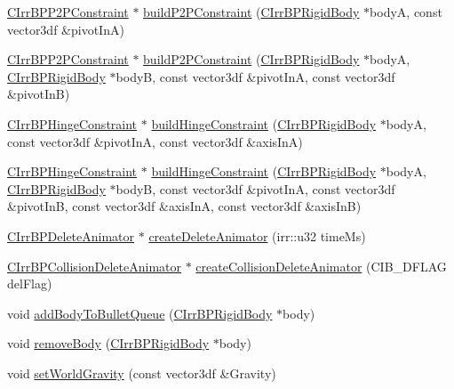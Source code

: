 \begin{DoxyCompactItemize}
\item 
\hyperlink{class_c_irr_b_p_p2_p_constraint}{CIrrBPP2PConstraint} $\ast$ \hyperlink{class_c_irr_b_p_manager_ab9b2ccaf431413e1ada692eb208a2302}{buildP2PConstraint} (\hyperlink{class_c_irr_b_p_rigid_body}{CIrrBPRigidBody} $\ast$bodyA, const vector3df \&pivotInA)
\item 
\hyperlink{class_c_irr_b_p_p2_p_constraint}{CIrrBPP2PConstraint} $\ast$ \hyperlink{class_c_irr_b_p_manager_aae111a76d0283935a6c7aa8dfb98e457}{buildP2PConstraint} (\hyperlink{class_c_irr_b_p_rigid_body}{CIrrBPRigidBody} $\ast$bodyA, \hyperlink{class_c_irr_b_p_rigid_body}{CIrrBPRigidBody} $\ast$bodyB, const vector3df \&pivotInA, const vector3df \&pivotInB)
\item 
\hyperlink{class_c_irr_b_p_hinge_constraint}{CIrrBPHingeConstraint} $\ast$ \hyperlink{class_c_irr_b_p_manager_a87b2610eaba14775ac81992ff71ab436}{buildHingeConstraint} (\hyperlink{class_c_irr_b_p_rigid_body}{CIrrBPRigidBody} $\ast$bodyA, const vector3df \&pivotInA, const vector3df \&axisInA)
\item 
\hyperlink{class_c_irr_b_p_hinge_constraint}{CIrrBPHingeConstraint} $\ast$ \hyperlink{class_c_irr_b_p_manager_a8a61e921b487d6249e46022b6e9b5ccf}{buildHingeConstraint} (\hyperlink{class_c_irr_b_p_rigid_body}{CIrrBPRigidBody} $\ast$bodyA, \hyperlink{class_c_irr_b_p_rigid_body}{CIrrBPRigidBody} $\ast$bodyB, const vector3df \&pivotInA, const vector3df \&pivotInB, const vector3df \&axisInA, const vector3df \&axisInB)
\item 
\hyperlink{class_c_irr_b_p_delete_animator}{CIrrBPDeleteAnimator} $\ast$ \hyperlink{class_c_irr_b_p_manager_a34d992b091c917aa9a0febddadf26141}{createDeleteAnimator} (irr::u32 timeMs)
\item 
\hyperlink{class_c_irr_b_p_collision_delete_animator}{CIrrBPCollisionDeleteAnimator} $\ast$ \hyperlink{class_c_irr_b_p_manager_a868af77531e0eb62d14ee060d2c91158}{createCollisionDeleteAnimator} (CIB\_\-DFLAG delFlag)
\item 
void \hyperlink{class_c_irr_b_p_manager_af5b96f07769449e5b4a7adb8485e027f}{addBodyToBulletQueue} (\hyperlink{class_c_irr_b_p_rigid_body}{CIrrBPRigidBody} $\ast$body)
\item 
void \hyperlink{class_c_irr_b_p_manager_ad4896d9448a572add3c84ca5118c6baa}{removeBody} (\hyperlink{class_c_irr_b_p_rigid_body}{CIrrBPRigidBody} $\ast$body)
\item 
void \hyperlink{class_c_irr_b_p_manager_ad3eea990a27f0ce4cfc2564c475f55f2}{setWorldGravity} (const vector3df \&Gravity)
\item 

\end{DoxyCompactItemize}
